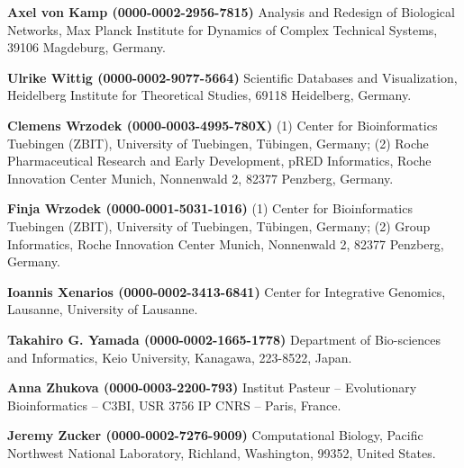 \documentclass{sbml-paper}
\begin{document}
\textbf{Axel von Kamp (0000-0002-2956-7815)} Analysis and Redesign of Biological Networks, Max Planck Institute for Dynamics of Complex Technical Systems, 39106 Magdeburg, Germany.

\textbf{Ulrike Wittig (0000-0002-9077-5664)} Scientific Databases and Visualization, Heidelberg Institute for Theoretical Studies, 69118 Heidelberg, Germany.

\textbf{Clemens Wrzodek (0000-0003-4995-780X)} (1) Center for Bioinformatics Tuebingen (ZBIT), University of Tuebingen, Tübingen, Germany; (2) Roche Pharmaceutical Research and Early Development, pRED Informatics, Roche Innovation Center Munich, Nonnenwald 2, 82377 Penzberg, Germany.

\textbf{Finja Wrzodek (0000-0001-5031-1016)} (1) Center for Bioinformatics Tuebingen (ZBIT), University of Tuebingen, Tübingen, Germany; (2) Group Informatics, Roche Innovation Center Munich, Nonnenwald 2, 82377 Penzberg, Germany.

\textbf{Ioannis Xenarios (0000-0002-3413-6841)} Center for Integrative Genomics, Lausanne, University of Lausanne.

\textbf{Takahiro G. Yamada (0000-0002-1665-1778)} Department of Bio-sciences and Informatics, Keio University, Kanagawa, 223-8522, Japan.

\textbf{Anna Zhukova (0000-0003-2200-793)} Institut Pasteur – Evolutionary Bioinformatics – C3BI, USR 3756 IP CNRS – Paris, France.

\textbf{Jeremy Zucker (0000-0002-7276-9009)} Computational Biology, Pacific Northwest National Laboratory, Richland, Washington, 99352, United States.
\end{document}
